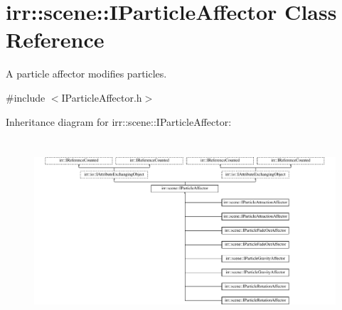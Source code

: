 \hypertarget{classirr_1_1scene_1_1IParticleAffector}{}\section{irr\+:\+:scene\+:\+:I\+Particle\+Affector Class Reference}
\label{classirr_1_1scene_1_1IParticleAffector}


A particle affector modifies particles.  




{\ttfamily \#include $<$I\+Particle\+Affector.\+h$>$}

Inheritance diagram for irr\+:\+:scene\+:\+:I\+Particle\+Affector\+:\begin{figure}[H]
\begin{center}
\leavevmode
\includegraphics[height=6.844445cm]{classirr_1_1scene_1_1IParticleAffector}
\end{center}
\end{figure}
